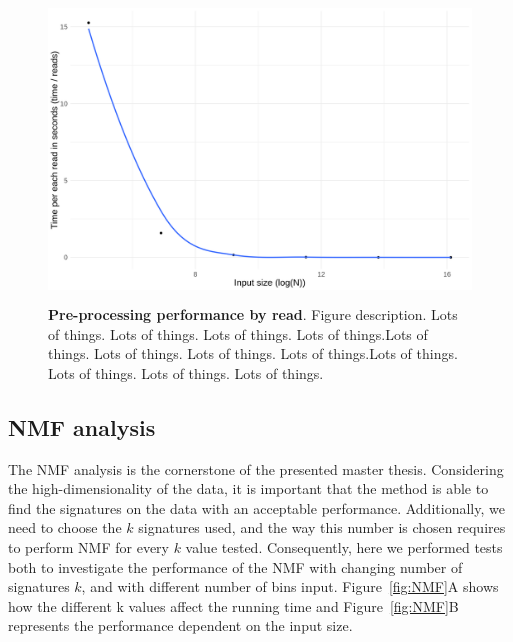 \begin{figure}[h]
    \centering
    \includegraphics[height=8cm]{Figures/performance/performance_per_read.png}
    \caption[Pre-processing performance by read]{\textbf{Pre-processing performance by read}. Figure description. Lots of things. Lots of things. Lots of things. Lots of things.Lots of things. Lots of things. Lots of things. Lots of things.Lots of things. Lots of things. Lots of things. Lots of things.}
    \label{fig:PreProcess}
\end{figure}

\medskip

\subsection{NMF analysis}

The NMF analysis is the cornerstone of the presented master thesis. Considering the high-dimensionality of the data, it is important that the method is able to find the signatures on the data with an acceptable performance. Additionally, we need to choose the \(k\) signatures used, and the way this number is chosen requires to perform NMF for every \(k\) value tested. Consequently, here we performed tests both to investigate the performance of the NMF with changing number of signatures \(k\), and with different number of bins input. Figure~\ref{fig:NMF}A shows how the different k values affect the running time and Figure~\ref{fig:NMF}B represents the performance dependent on the input size.

